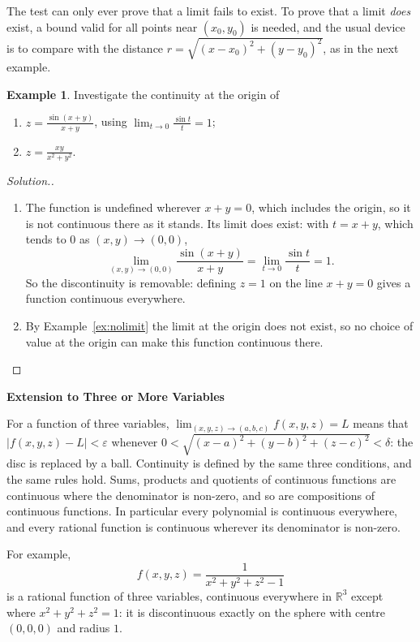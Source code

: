 \documentclass[11pt,a4paper]{article}
\theoremstyle{definition}
\newtheorem{exa}[thm]{Example}
\newenvironment{solution}
  {\renewcommand{\qedsymbol}{}\begin{proof}[\textit{Solution}.]}
  {\end{proof}}
\newcommand{\subhead}[1]{%
  \par\medskip\noindent\textbf{#1}\par\nobreak\smallskip}
\begin{document}
The test can only ever prove that a limit fails to exist. To prove that a limit
\emph{does} exist, a bound valid for all points near $(x_0,y_0)$ is needed, and
the usual device is to compare with the distance
$r = \sqrt{(x-x_0)^2 + (y-y_0)^2}$, as in the next example.

\begin{exa}
\label{ex:continuityorigin}
Investigate the continuity at the origin of
\begin{enumerate}
\item $z = \frac{\sin (x+y)}{x + y}$, using $\lim_{t\to 0} \frac{\sin t}{t}=1$;

\item $z = \frac{xy}{x^2 + y^2}$.
\end{enumerate}
\end{exa}

\begin{solution}
\begin{enumerate}
\item The function is undefined wherever $x + y = 0$, which includes the origin,
so it is not continuous there as it stands. Its limit does exist: with
$t = x + y$, which tends to $0$ as $(x,y)\to (0,0)$,
\[\lim_{(x,y)\to(0,0)}\frac{\sin(x+y)}{x+y} = \lim_{t\to 0}\frac{\sin t}{t} = 1 .\]
So the discontinuity is removable: defining $z = 1$ on the line $x + y = 0$ gives
a function continuous everywhere.

\item By Example~\ref{ex:nolimit} the limit at the origin does not exist, so no
choice of value at the origin can make this function continuous there.
\end{enumerate}
\end{solution}

\subhead{Extension to Three or More Variables}

For a function of three variables,
$\lim_{(x,y,z)\to (a,b,c)}f(x,y,z) =L$ means that $|f(x,y,z) - L|<\varepsilon$
whenever $0 < \sqrt{(x-a)^2 + (y-b)^2 + (z-c)^2} < \delta$: the disc is replaced by
a ball. Continuity is defined by the same three conditions, and the same rules
hold. Sums, products and quotients of continuous functions are continuous where
the denominator is non-zero, and so are compositions of continuous functions. In
particular every polynomial is continuous everywhere, and every rational
function is continuous wherever its denominator is non-zero.

For example,
\[f(x,y,z) = \frac{1}{x^2 + y^2 + z^2 - 1}\]
is a rational function of three variables, continuous everywhere in
$\mathbb{R}^3$ except where $x^2 + y^2 + z^2 = 1$: it is discontinuous exactly on
the sphere with centre $(0,0,0)$ and radius $1$.
\end{document}
